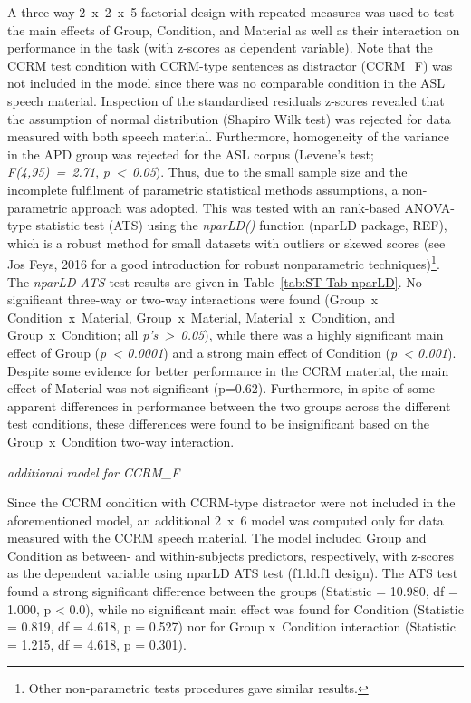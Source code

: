 \documentclass[a4paper, twoside]{templates/ociamthesis}
\begin{document}
A three-way 2~x~2~x~5 factorial design with repeated measures was used to test the main effects of Group, Condition, and Material as well as their interaction on performance in the task (with z-scores as dependent variable). Note that the CCRM test condition with CCRM-type sentences as distractor (CCRM\_F) was not included in the model since there was no comparable condition in the ASL speech material. Inspection of the standardised residuals z-scores revealed that the assumption of normal distribution (Shapiro Wilk test) was rejected for data measured with both speech material. Furthermore, homogeneity of the variance in the APD group was rejected for the ASL corpus (Levene's test; \emph{F(4,95)~=~2.71}, \emph{p~\textless~0.05}). Thus, due to the small sample size and the incomplete fulfilment of parametric statistical methods assumptions, a non-parametric approach was adopted. This was tested with an rank-based ANOVA-type statistic test (ATS) using the \emph{nparLD()} function (nparLD package, REF), which is a robust method for small datasets with outliers or skewed scores (see Jos Feys, 2016 for a good introduction for robust nonparametric techniques)\footnote{Other non-parametric tests procedures gave similar results.}. The \emph{nparLD ATS} test results are given in Table~\ref{tab:ST-Tab-nparLD}. No significant three-way or two-way interactions were found (Group~x Condition~x~Material, Group~x~Material, Material~x~Condition, and Group~x~Condition; all \emph{p's~\textgreater~0.05}), while there was a highly significant main effect of Group (\emph{p~\textless{} 0.0001}) and a strong main effect of Condition (\emph{p~\textless{} 0.001}). Despite some evidence for better performance in the CCRM material, the main effect of Material was not significant (p=0.62). Furthermore, in spite of some apparent differences in performance between the two groups across the different test conditions, these differences were found to be insignificant based on the Group~x~Condition two-way interaction.

\colorbox[HTML]{CCCCFF}{\emph{additional model for CCRM\_F}}

Since the CCRM condition with CCRM-type distractor were not included in the aforementioned model, an additional 2~x~6 model was computed only for data measured with the CCRM speech material. The model included Group and Condition as between- and within-subjects predictors, respectively, with z-scores as the dependent variable using nparLD ATS test (f1.ld.f1 design). The ATS test found a strong significant difference between the groups (Statistic = 10.980, df = 1.000, p \textless{} 0.0), while no significant main effect was found for Condition (Statistic = 0.819, df = 4.618, p = 0.527) nor for Group x~Condition interaction (Statistic = 1.215, df = 4.618, p = 0.301).
\end{document}
